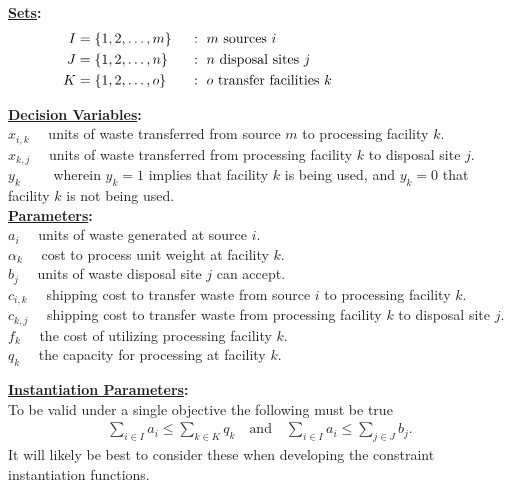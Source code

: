 \documentclass[12pt]{amsart}
\begin{document}
\textbf{\underline{Sets}:} 
\begin{alignat*}{2}
	I &= \{1,2,\ldots,m\}\ & &:\ m \text{ sources } i \hspace{30ex} \\
	J &= \{1,2,\ldots,n\}\ & &:\ n \text{ disposal sites } j  \\
	K &= \{1,2,\ldots,o\}\ & &:\ o \text{ transfer facilities } k 
\end{alignat*} 

\textbf{\underline{Decision Variables}:} \\ 

\noindent
\(x_{i,k}\quad\) units of waste transferred from source \(m\) to processing facility \(k\). \\
\(x_{k,j}\quad\) units of waste transferred from processing facility \(k\) to disposal site \(j\). \\
\(y_k\qquad\!\) wherein \(y_k=1\) implies that facility \(k\) is being used,
and \(y_k=0\) that facility \(k\) is not being used. \\

\textbf{\underline{Parameters}:} \\

\noindent
\(a_i\quad\) units of waste generated at source \(i\). \\
\(\alpha_k\quad\) cost to process unit weight at facility \(k\). \\
\(b_j\quad\) units of waste disposal site \(j\) can accept. \\
\(c_{i,k}\quad\) shipping cost to transfer waste from source \(i\) to processing facility \(k\). \\
\(c_{k,j}\quad\) shipping cost to transfer waste from processing facility \(k\) to disposal site \(j\). \\
\(f_k\quad\) the cost of utilizing processing facility \(k\). \\
\(q_k\quad\) the capacity for processing at facility \(k\). \\

\clearpage

\textbf{\underline{Instantiation Parameters}:} \\

\noindent
To be valid under a single objective the following must be true
\begin{align*}
	\sum_{i\in I}a_i \leq \sum_{k\in K}q_k \quad\text{and}\quad
	\sum_{i\in I}a_i \leq \sum_{j\in J}b_j .
\end{align*}
It will likely be best to consider these when developing the
constraint instantiation functions. \\
\end{document}
